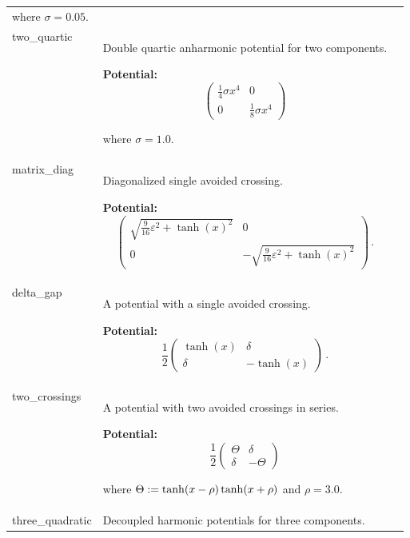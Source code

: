\begin{longtable}{|p{\varnamewidth}|p{\vardescrwidth}|l}
where $\sigma = 0.05$.
&\\
\cline{1-2}
\raggedright t\-w\-o\-\_\-q\-u\-a\-r\-t\-i\-c\- & \raggedright Double quartic anharmonic potential for two components.

\textbf{Potential:}
\begin{equation}
  \begin{pmatrix}
    \frac{1}{4} \sigma x^4 & 0 \\
    0                      & \frac{1}{8} \sigma x^4
  \end{pmatrix}
\end{equation}

where $\sigma = 1.0$.
&\\
\cline{1-2}
\raggedright m\-a\-t\-r\-i\-x\-1\-\_\-d\-i\-a\-g\- & \raggedright Diagonalized single avoided crossing.

\textbf{Potential:}
\begin{equation}
  \begin{pmatrix}
    \sqrt{\frac{9}{16} \varepsilon^2 + \tanh(x)^2} & 0 \\
    0                                              & -\sqrt{\frac{9}{16} \varepsilon^2 + \tanh(x)^2}
  \end{pmatrix} \,.
\end{equation}
&\\
\cline{1-2}
\raggedright d\-e\-l\-t\-a\-\_\-g\-a\-p\- & \raggedright A potential with a single avoided crossing.

\textbf{Potential:}
\begin{equation}
  \frac{1}{2}
  \begin{pmatrix}
    \tanh(x) & \delta \\
    \delta   & -\tanh(x)
  \end{pmatrix} \,.
\end{equation}
&\\
\cline{1-2}
\raggedright t\-w\-o\-\_\-c\-r\-o\-s\-s\-i\-n\-g\-s\- & \raggedright A potential with two avoided crossings in series.

\textbf{Potential:}
\begin{equation}
  \frac{1}{2}
  \begin{pmatrix}
    \Theta & \delta \\
    \delta & -\Theta
  \end{pmatrix}
\end{equation}

where $\Theta := \tanh(x-\rho) \tanh(x+\rho)$ and $\rho = 3.0$.
&\\
\cline{1-2}
\raggedright t\-h\-r\-e\-e\-\_\-q\-u\-a\-d\-r\-a\-t\-i\-c\- & \raggedright Decoupled harmonic potentials for three components.


\end{longtable}
